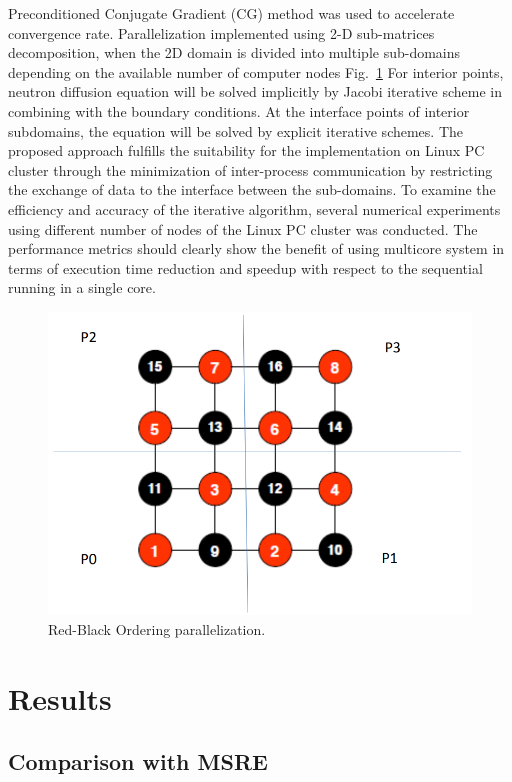\documentclass{anstrans}
\begin{document}
Preconditioned Conjugate Gradient (CG) method was used to accelerate convergence rate. Parallelization implemented using 2-D sub-matrices decomposition, when the 2D domain is divided into multiple sub-domains depending on the available number of computer nodes Fig.~\ref{fig:parallel} For interior points, neutron diffusion equation will be solved implicitly by Jacobi iterative scheme in combining with the boundary conditions. At the interface points of interior subdomains, the equation will be solved by explicit iterative schemes. The proposed approach fulfills the suitability for the implementation on Linux PC cluster through the minimization of inter-process communication by restricting the exchange of data to the interface between the sub-domains. To examine the efficiency and accuracy of the iterative algorithm, several numerical experiments using different number of nodes of the Linux PC cluster was conducted. The performance metrics should clearly show the benefit of using multicore system in terms of execution time reduction and speedup with respect to the sequential running in a single core.
\begin{figure}[thbp!] %
  \centering
  \vspace{-0.3em}
  \includegraphics[width=0.95\linewidth]{parallel.png}
  \caption{Red-Black Ordering parallelization.}
  \vspace{-0.6em}
  \label{fig:parallel}
\end{figure}
\FloatBarrier

\section{Results}
\subsection{Comparison with \gls{MSRE}}
\end{document}
